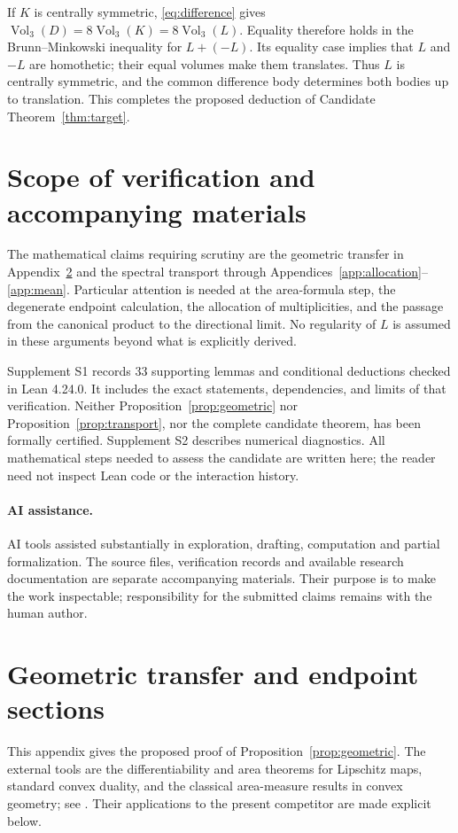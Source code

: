 \documentclass[11pt,a4paper]{article}
\theoremstyle{definition}
\theoremstyle{remark}
\newcommand{\vol}{\operatorname{Vol}_3}
\numberwithin{equation}{section}
\begin{document}
If $K$ is centrally symmetric, \eqref{eq:difference} gives
$\vol(D)=8\vol(K)=8\vol(L)$. Equality therefore holds in the
Brunn--Minkowski inequality for $L+(-L)$. Its equality case implies that
$L$ and $-L$ are homothetic; their equal volumes make them translates.
Thus $L$ is centrally symmetric, and the common difference body determines
both bodies up to translation. This completes the proposed deduction of
Candidate Theorem~\ref{thm:target}.

\section{Scope of verification and accompanying materials}\label{sec:verification}
The mathematical claims requiring scrutiny are the geometric transfer in
Appendix~\ref{app:geometry} and the spectral transport through
Appendices~\ref{app:allocation}--\ref{app:mean}. Particular attention is
needed at the area-formula step, the degenerate endpoint calculation,
the allocation of multiplicities, and the passage from the canonical
product to the directional limit. No regularity of $L$ is assumed in
these arguments beyond what is explicitly derived.

Supplement S1 records 33 supporting lemmas and conditional deductions
checked in Lean 4.24.0. It includes the exact statements, dependencies,
and limits of that verification. Neither Proposition~\ref{prop:geometric}
nor Proposition~\ref{prop:transport}, nor the complete candidate theorem,
has been formally certified. Supplement S2 describes numerical diagnostics.
All mathematical steps needed to assess the candidate are written here;
the reader need not inspect Lean code or the interaction history.

\paragraph{AI assistance.}
AI tools assisted substantially in exploration, drafting, computation and
partial formalization. The source files, verification records and available
research documentation are separate accompanying materials. Their purpose
is to make the work inspectable; responsibility for the submitted claims
remains with the human author.

\appendix
\section{Geometric transfer and endpoint sections}\label{app:geometry}
This appendix gives the proposed proof of Proposition~\ref{prop:geometric}.
The external tools are the differentiability and area theorems for Lipschitz
maps, standard convex duality, and the classical area-measure results in
convex geometry; see \cite{EvansGariepy,Schneider}. Their applications to
the present competitor are made explicit below.
\end{document}
